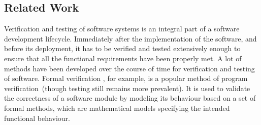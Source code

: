 \raggedbottom
\subsection{Related Work}

Verification and testing of software systems \cite{myers2011art} is an integral part of a software development lifecycle. Immediately after the implementation of the software, and before its deployment, it has to be verified and tested extensively enough to ensure that all the functional requirements have been properly met. A lot of methods have been developed over the course of time for verification and testing of software. Formal verification \cite{wang2004formal}, for example, is a popular method of program verification~(though testing still remains more prevalent). It is used to validate the correctness of a software module by modeling its behaviour based on a set of formal methods, which are mathematical models specifying the intended functional behaviour. %


